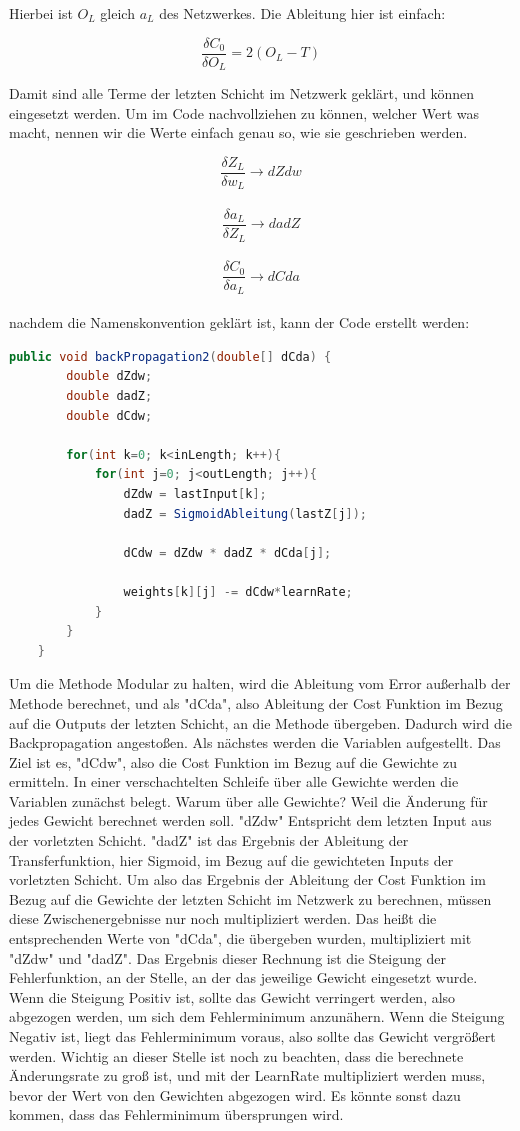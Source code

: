 \documentclass[12pt]{article}
\begin{document}
Hierbei ist $O_L$ gleich $a_L$ des Netzwerkes.
Die Ableitung hier ist einfach:

$$\frac{\delta C_0}{\delta O_L} = 2(O_L - T)$$

Damit sind alle Terme der letzten Schicht im Netzwerk geklärt, und können eingesetzt werden.
Um im Code nachvollziehen zu können, welcher Wert was macht, nennen wir die Werte einfach genau so, wie sie geschrieben werden.


$$\frac{\delta Z_L}{\delta w_L} \rightarrow dZdw $$ \\
$$\frac{\delta a_L}{\delta Z_L} \rightarrow dadZ $$ \\
$$\frac{\delta C_0}{\delta a_L} \rightarrow dCda $$ \\

nachdem die Namenskonvention geklärt ist, kann der Code erstellt werden:

\begin{lstlisting}[language=Java] 
    public void backPropagation2(double[] dCda) {
        double dZdw;
        double dadZ;
        double dCdw;

        for(int k=0; k<inLength; k++){
            for(int j=0; j<outLength; j++){
                dZdw = lastInput[k];
                dadZ = SigmoidAbleitung(lastZ[j]);

                dCdw = dZdw * dadZ * dCda[j];

                weights[k][j] -= dCdw*learnRate;
            }
        }
    }
\end{lstlisting} 

Um die Methode Modular zu halten, wird die Ableitung vom Error außerhalb der Methode berechnet, und als "dCda", also Ableitung der Cost Funktion im Bezug auf die Outputs der letzten Schicht, an die Methode übergeben. Dadurch wird die Backpropagation angestoßen. Als nächstes werden die Variablen aufgestellt. Das Ziel ist es, "dCdw", also die Cost Funktion im Bezug auf die Gewichte zu ermitteln. 
In einer verschachtelten Schleife über alle Gewichte werden die Variablen zunächst belegt.
Warum über alle Gewichte? Weil die Änderung für jedes Gewicht berechnet werden soll. 
"dZdw" Entspricht dem letzten Input aus der vorletzten Schicht. "dadZ" ist das Ergebnis der Ableitung der Transferfunktion, hier Sigmoid, im Bezug auf die gewichteten Inputs der vorletzten Schicht.
Um also das Ergebnis der Ableitung der Cost Funktion im Bezug auf die Gewichte der letzten Schicht im Netzwerk zu berechnen, müssen diese Zwischenergebnisse nur noch multipliziert werden. Das heißt die entsprechenden Werte von "dCda", die übergeben wurden, multipliziert mit "dZdw" und "dadZ".
Das Ergebnis dieser Rechnung ist die Steigung der Fehlerfunktion, an der Stelle, an der das jeweilige Gewicht eingesetzt wurde. Wenn die Steigung Positiv ist, sollte das Gewicht verringert werden, also abgezogen werden, um sich dem Fehlerminimum anzunähern.
Wenn die Steigung Negativ ist, liegt das Fehlerminimum voraus, also sollte das Gewicht vergrößert werden.
Wichtig an dieser Stelle ist noch zu beachten, dass die berechnete Änderungsrate zu groß ist, und mit der LearnRate multipliziert werden muss, bevor der Wert von den Gewichten abgezogen wird. Es könnte sonst dazu kommen, dass das Fehlerminimum übersprungen wird.
\end{document}
